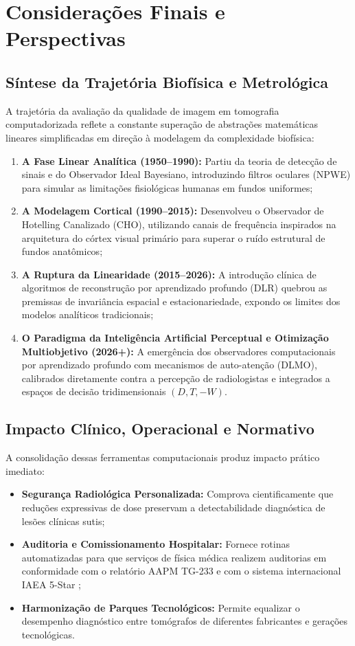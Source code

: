 \chapter{Considerações Finais e Perspectivas}
\label{chap:conclusoes}

\section{Síntese da Trajetória Biofísica e Metrológica}
\label{sec:sintese_biofisica}

A trajetória da avaliação da qualidade de imagem em tomografia computadorizada reflete a constante superação de abstrações matemáticas lineares simplificadas em direção à modelagem da complexidade biofísica:
\begin{enumerate}
  \item \textbf{A Fase Linear Analítica (1950--1990):} Partiu da teoria de detecção de sinais e do Observador Ideal Bayesiano, introduzindo filtros oculares (NPWE) para simular as limitações fisiológicas humanas em fundos uniformes;
  \item \textbf{A Modelagem Cortical (1990--2015):} Desenvolveu o Observador de Hotelling Canalizado (CHO), utilizando canais de frequência inspirados na arquitetura do córtex visual primário para superar o ruído estrutural de fundos anatômicos;
  \item \textbf{A Ruptura da Linearidade (2015--2026):} A introdução clínica de algoritmos de reconstrução por aprendizado profundo (DLR) quebrou as premissas de invariância espacial e estacionariedade, expondo os limites dos modelos analíticos tradicionais;
  \item \textbf{O Paradigma da Inteligência Artificial Perceptual e Otimização Multiobjetivo (2026+):} A emergência dos observadores computacionais por aprendizado profundo com mecanismos de auto-atenção (DLMO), calibrados diretamente contra a percepção de radiologistas e integrados a espaços de decisão tridimensionais $(D, T, -W)$.
\end{enumerate}

\section{Impacto Clínico, Operacional e Normativo}
\label{sec:impacto_clinico}

A consolidação dessas ferramentas computacionais produz impacto prático imediato:
\begin{itemize}
  \item \textbf{Segurança Radiológica Personalizada:} Comprova cientificamente que reduções expressivas de dose preservam a detectabilidade diagnóstica de lesões clínicas sutis;
  \item \textbf{Auditoria e Comissionamento Hospitalar:} Fornece rotinas automatizadas para que serviços de física médica realizem auditorias em conformidade com o relatório AAPM TG-233 e com o sistema internacional IAEA 5-Star \cite{iaea_5star_2026};
  \item \textbf{Harmonização de Parques Tecnológicos:} Permite equalizar o desempenho diagnóstico entre tomógrafos de diferentes fabricantes e gerações tecnológicas.
\end{itemize}

